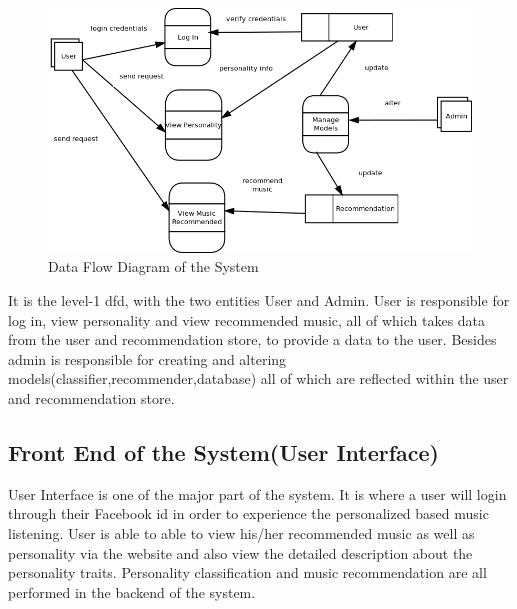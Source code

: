 \begin{figure}[!ht]
\centering
\includegraphics[width = 16 cm]{fig/dfd.png}
\caption{Data Flow Diagram of the System}
\label{fig:dfd}
\end{figure}

It is the level-1 dfd, with the two entities User and Admin. User is responsible for log in, view personality and view recommended music, all of which takes data from the user and recommendation store, to provide a data to the user. Besides admin is responsible for creating and altering models(classifier,recommender,database) all of which are reflected within the user and recommendation store.

\subsection{Front End of the System(User Interface)}
User Interface is one of the major part of the system. It is where a user will login through their Facebook id in order to experience the personalized based music listening. User is able to able to view his/her recommended music as well as personality via the website and also view the detailed description about the personality traits. Personality classification and music recommendation are all performed in the backend of the system.


